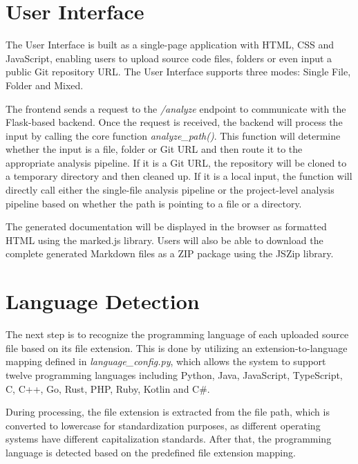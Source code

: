\section{User Interface}
\hspace{0.5cm} The User Interface is built as a single-page application with HTML, CSS and JavaScript, enabling users to upload source code files, folders or even input a public Git repository URL. The User Interface supports three modes: Single File, Folder and Mixed.

\par The frontend sends a request to the \textit{/analyze} endpoint to communicate with the Flask-based backend. Once the request is received, the backend will process the input by calling the core function \textit{analyze\_path()}. This function will determine whether the input is a file, folder or Git URL and then route it to the appropriate analysis pipeline. If it is a Git URL, the repository will be cloned to a temporary directory and then cleaned up. If it is a local input, the function will directly call either the single-file analysis pipeline or the project-level analysis pipeline based on whether the path is pointing to a file or a directory.

\par The generated documentation will be displayed in the browser as formatted HTML using the marked.js library. Users will also be able to download the complete generated Markdown files as a ZIP package using the JSZip library.

\section{Language Detection}
\hspace{0.5cm}
The next step is to recognize the programming language of each uploaded source file based on its file extension. This is done by utilizing an extension-to-language mapping defined in \textit{language\_config.py}, which allows the system to support twelve programming languages including Python, Java, JavaScript, TypeScript, C, C++, Go, Rust, PHP, Ruby, Kotlin and C\#.

\par During processing, the file extension is extracted from the file path, which is converted to lowercase for standardization purposes, as different operating systems have different capitalization standards. After that, the programming language is detected based on the predefined file extension mapping.

